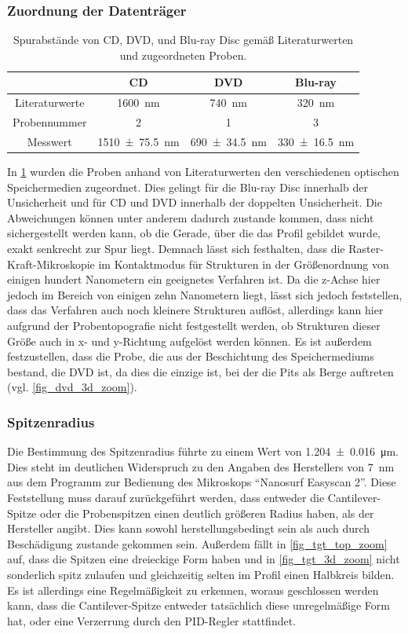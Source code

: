 \documentclass[
	a4paper,
	12pt,
	pagesize,
	ngerman
]{scrartcl}
\begin{document}
	\subsubsection{Zuordnung der Datenträger}
	\begin{table}[H]
		\centering
		\begin{tabular}{ c | c | c | c}
			&CD \cite{CD}&DVD \cite{DVD}&Blu-ray \cite{blu}\\ \hline
			Literaturwerte & \SI{1600}{\nano \meter} & \SI{740}{\nano \meter}& \SI{320}{\nano \meter}\\
			Probennummer & 2 & 1 & 3\\
			Messwert & \SI{1510+-75,5}{\nano \meter} & \SI{690 +-34,5}{\nano \meter} & \SI{330 +- 16,5}{\nano \meter}\\
		\end{tabular}
		\caption{Spurabstände von CD, DVD, und Blu-ray Disc gemäß Literaturwerten und zugeordneten Proben.}
		\label{tb_lit_Spurabstände}
	\end{table}
	In \cref{tb_lit_Spurabstände} wurden die Proben anhand von Literaturwerten den verschiedenen optischen Speichermedien zugeordnet.
	Dies gelingt für die Blu-ray Disc innerhalb der Unsicherheit und für CD und DVD innerhalb der doppelten Unsicherheit.
	Die Abweichungen können unter anderem dadurch zustande kommen, dass nicht sichergestellt werden kann, ob die Gerade, über die das Profil gebildet wurde, exakt senkrecht zur Spur liegt.
	Demnach lässt sich festhalten, dass die Raster-Kraft-Mikroskopie im Kontaktmodus für Strukturen in der Größenordnung von einigen hundert Nanometern ein geeignetes Verfahren ist.
	Da die z-Achse hier jedoch im Bereich von einigen zehn Nanometern liegt, lässt sich jedoch feststellen, dass das Verfahren auch noch kleinere Strukturen auflöst, allerdings kann hier aufgrund der Probentopografie nicht festgestellt werden, ob Strukturen dieser Größe auch in x- und y-Richtung aufgelöst werden können.
	Es ist außerdem festzustellen, dass die Probe, die aus der Beschichtung des Speichermediums bestand, die DVD ist, da dies die einzige ist, bei der die Pits als Berge auftreten (vgl. \cref{fig_dvd_3d_zoom}).

	\subsubsection{Spitzenradius}
	Die Bestimmung des Spitzenradius führte zu einem Wert von \SI{1,204 +- 0,016}{\micro \meter}.
	Dies steht im deutlichen Widerspruch zu den Angaben des Herstellers von \SI{7}{\nano \meter} aus dem Programm zur Bedienung des Mikroskops \enquote{Nanosurf Easyscan 2}.
	Diese Feststellung muss darauf zurückgeführt werden, dass entweder die Cantilever-Spitze oder die Probenspitzen einen deutlich größeren Radius haben, als der Hersteller angibt.
	Dies kann sowohl herstellungsbedingt sein als auch durch Beschädigung zustande gekommen sein.
	Außerdem fällt in \cref{fig_tgt_top_zoom} auf, dass die Spitzen eine dreieckige Form haben und in \cref{fig_tgt_3d_zoom} nicht sonderlich spitz zulaufen und gleichzeitig selten im Profil einen Halbkreis bilden.
	Es ist allerdings eine Regelmäßigkeit zu erkennen, woraus geschlossen werden kann, dass die Cantilever-Spitze entweder tatsächlich diese unregelmäßige Form hat, oder eine Verzerrung durch den PID-Regler stattfindet.
\end{document}
